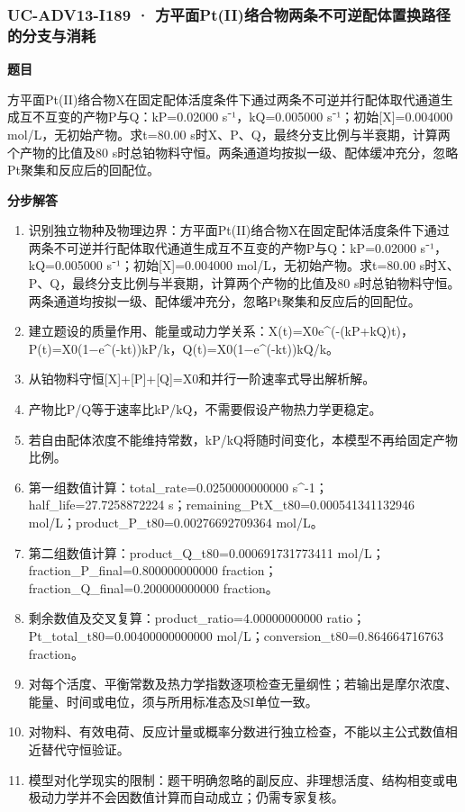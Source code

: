 \documentclass[UTF8,11pt,a4paper]{ctexart}
\begin{document}
\subsubsection*{UC-ADV13-I189 · 方平面Pt(II)络合物两条不可逆配体置换路径的分支与消耗}
\noindent\textbf{题目}\par
方平面Pt(II)络合物X在固定配体活度条件下通过两条不可逆并行配体取代通道生成互不互变的产物P与Q：kP=0.02000 s⁻¹，kQ=0.005000 s⁻¹；初始[X]=0.004000 mol/L，无初始产物。求t=80.00 s时X、P、Q，最终分支比例与半衰期，计算两个产物的比值及80 s时总铂物料守恒。两条通道均按拟一级、配体缓冲充分，忽略Pt聚集和反应后的回配位。\par
\medskip\noindent\textbf{分步解答}
\begin{enumerate}
\item 识别独立物种及物理边界：方平面Pt(II)络合物X在固定配体活度条件下通过两条不可逆并行配体取代通道生成互不互变的产物P与Q：kP=0.02000 s⁻¹，kQ=0.005000 s⁻¹；初始[X]=0.004000 mol/L，无初始产物。求t=80.00 s时X、P、Q，最终分支比例与半衰期，计算两个产物的比值及80 s时总铂物料守恒。两条通道均按拟一级、配体缓冲充分，忽略Pt聚集和反应后的回配位。
\item 建立题设的质量作用、能量或动力学关系：X(t)=X0e\textasciicircum{}(-(kP+kQ)t)，P(t)=X0(1−e\textasciicircum{}(-kt))kP/k，Q(t)=X0(1−e\textasciicircum{}(-kt))kQ/k。
\item 从铂物料守恒[X]+[P]+[Q]=X0和并行一阶速率式导出解析解。
\item 产物比P/Q等于速率比kP/kQ，不需要假设产物热力学更稳定。
\item 若自由配体浓度不能维持常数，kP/kQ将随时间变化，本模型不再给固定产物比例。
\item 第一组数值计算：total\_rate=0.0250000000000 s\textasciicircum{}-1；half\_life=27.7258872224 s；remaining\_PtX\_t80=0.000541341132946 mol/L；product\_P\_t80=0.00276692709364 mol/L。
\item 第二组数值计算：product\_Q\_t80=0.000691731773411 mol/L；fraction\_P\_final=0.800000000000 fraction；fraction\_Q\_final=0.200000000000 fraction。
\item 剩余数值及交叉复算：product\_ratio=4.00000000000 ratio；Pt\_total\_t80=0.00400000000000 mol/L；conversion\_t80=0.864664716763 fraction。
\item 对每个活度、平衡常数及热力学指数逐项检查无量纲性；若输出是摩尔浓度、能量、时间或电位，须与所用标准态及SI单位一致。
\item 对物料、有效电荷、反应计量或概率分数进行独立检查，不能以主公式数值相近替代守恒验证。
\item 模型对化学现实的限制：题干明确忽略的副反应、非理想活度、结构相变或电极动力学并不会因数值计算而自动成立；仍需专家复核。
\end{enumerate}
\end{document}
